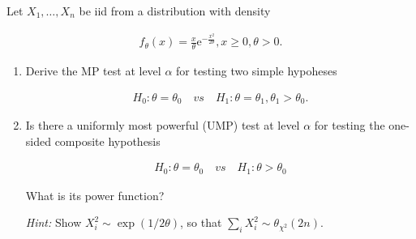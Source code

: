 
\begin{exercise}

Let $X_1, \dots, X_n$ be iid from a distribution with density

\begin{align*}
    f_\theta(x) = \frac{x}{\theta} \mathrm e^{-\frac{x^2}{2 \theta}},
    x \geq 0,
    \theta > 0.
\end{align*}

\begin{enumerate}[label = (\alph*)]

    \item Derive the MP test at level $\alpha$ for testing two simple hypoheses
    
    \begin{align*}
        H_0: \theta = \theta_0
        \quad
        \textit{vs}
        \quad
        H_1: \theta = \theta_1, \theta_1 > \theta_0.
    \end{align*}

    \item Is there a uniformly most powerful (UMP) test at level $\alpha$ for testing the one-sided composite hypothesis
    
    \begin{align*}
        H_0: \theta = \theta_0
        \quad
        \textit{vs}
        \quad
        H_1: \theta > \theta_0
    \end{align*}

    What is its power function?

    \textit{Hint:}
    Show $X_i^2 \sim \exp(1 / 2 \theta)$, so that $\sum_i X_i^2 \sim \theta_{\chi^2}(2 n)$.

\end{enumerate}

\end{exercise}



